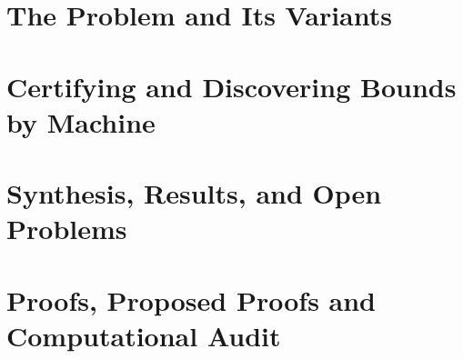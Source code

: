 \tableofcontents


\cleardoublepage
{}

\chapter{The Problem and Its Variants}\label{ch:basecases}


\chapter{Certifying and Discovering Bounds by Machine}
\label{ch:machine}\label{ch:certify}\label{ch:discover}


\chapter{Synthesis, Results, and Open Problems}\label{ch:synthesis}



\appendix
{}

\chapter{Proofs, Proposed Proofs and Computational Audit}\label{app:proofs}






\makefacultybackcover


